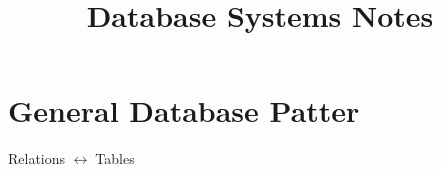 \documentclass{article}
\def\biconditional{$\leftrightarrow\;$}
\begin{document}
\pagestyle{empty}

\title{Database Systems Notes}
\date{}
\maketitle

\section{General Database Patter}

Relations \biconditional Tables
\end{document}
